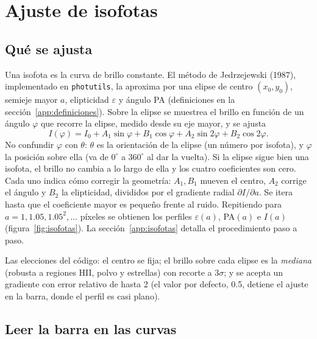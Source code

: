 \documentclass[11pt,a4paper]{article}
\newcommand{\code}[1]{\texttt{#1}}
\begin{document}
\section{Ajuste de isofotas}\label{sec:isofotas}

\subsection{Qué se ajusta}

Una isofota es la curva de brillo constante. El método de Jedrzejewski (1987), implementado en \code{photutils},
la aproxima por una elipse de centro $(x_0, y_0)$, semieje mayor $a$, elipticidad $\varepsilon$ y ángulo PA (definiciones en la sección~\ref{app:definiciones}).
Sobre la elipse se muestrea el brillo en función de un ángulo $\varphi$ que recorre la elipse, medido desde su
eje mayor, y se ajusta
\begin{equation}\label{eq:jedr}
I(\varphi) = I_0 + A_1\sin \varphi + B_1\cos \varphi + A_2\sin 2\varphi + B_2\cos 2\varphi .
\end{equation}
No confundir $\varphi$ con $\theta$: $\theta$ es la orientación de la elipse (un número por isofota), y
$\varphi$ la posición sobre ella (va de $0^\circ$ a $360^\circ$ al dar la vuelta).
Si la elipse sigue bien una isofota, el brillo no cambia a lo largo de ella y los cuatro coeficientes son cero.
Cada uno indica cómo corregir la geometría: $A_1, B_1$ mueven el centro, $A_2$ corrige el ángulo y $B_2$ la
elipticidad, divididos por el gradiente radial $\partial I/\partial a$. Se itera hasta que el coeficiente mayor
es pequeño frente al ruido. Repitiendo para $a = 1, 1.05, 1.05^2,\dots$ píxeles se obtienen los perfiles
$\varepsilon(a)$, PA$(a)$ e $I(a)$ (figura~\ref{fig:isofotas}). La sección~\ref{app:isofotas} detalla el procedimiento paso a paso.

Las elecciones del código: el centro se fija; el brillo sobre cada elipse es la \emph{mediana} (robusta a regiones
HII, polvo y estrellas) con recorte a $3\sigma$; y se acepta un gradiente con error relativo de hasta 2 (el valor
por defecto, 0.5, detiene el ajuste en la barra, donde el perfil es casi plano).

\subsection{Leer la barra en las curvas}
\end{document}
